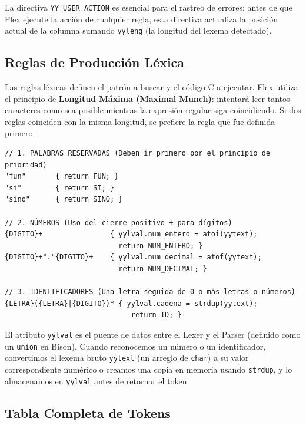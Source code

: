 La directiva \texttt{YY\_USER\_ACTION} es esencial para el rastreo de errores: antes de que Flex ejecute la acción de cualquier regla, esta directiva actualiza la posición actual de la columna sumando \texttt{yyleng} (la longitud del lexema detectado).

\subsection{Reglas de Producción Léxica}

Las reglas léxicas definen el patrón a buscar y el código C a ejecutar. Flex utiliza el principio de \textbf{Longitud Máxima (Maximal Munch)}: intentará leer tantos caracteres como sea posible mientras la expresión regular siga coincidiendo. Si dos reglas coinciden con la misma longitud, se prefiere la regla que fue definida primero.

\begin{lstlisting}[style=cstyle, caption={Reglas para palabras reservadas e identificadores}]
// 1. PALABRAS RESERVADAS (Deben ir primero por el principio de prioridad)
"fun"       { return FUN; }
"si"        { return SI; }
"sino"      { return SINO; }

// 2. NÚMEROS (Uso del cierre positivo + para dígitos)
{DIGITO}+                { yylval.num_entero = atoi(yytext);  
                           return NUM_ENTERO; }
{DIGITO}+"."{DIGITO}+    { yylval.num_decimal = atof(yytext); 
                           return NUM_DECIMAL; }

// 3. IDENTIFICADORES (Una letra seguida de 0 o más letras o números)
{LETRA}({LETRA}|{DIGITO})* { yylval.cadena = strdup(yytext); 
                              return ID; }
\end{lstlisting}

\begin{notebox}
El atributo \texttt{yylval} es el puente de datos entre el Lexer y el Parser (definido como un \texttt{union} en Bison). Cuando reconocemos un número o un identificador, convertimos el lexema bruto \texttt{yytext} (un arreglo de \texttt{char}) a su valor correspondiente numérico o creamos una copia en memoria usando \texttt{strdup}, y lo almacenamos en \texttt{yylval} antes de retornar el token.
\end{notebox}

\subsection{Tabla Completa de Tokens}

